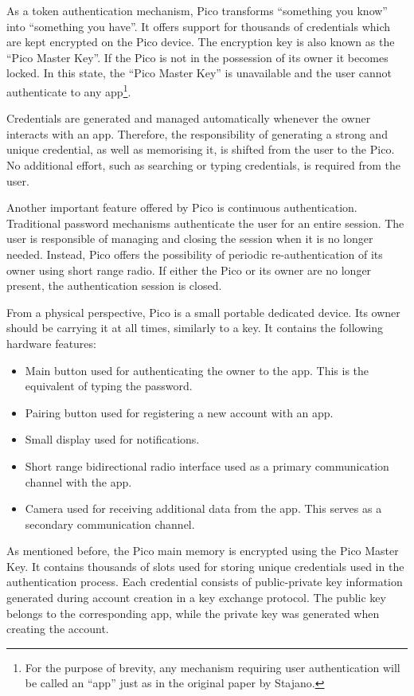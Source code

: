 As a token authentication mechanism, Pico transforms ``something you know'' into ``something you have''. It offers support for thousands of credentials which are kept encrypted on the Pico device. The encryption key is also known as the ``Pico Master Key''. If the Pico is not in the possession of its owner it becomes locked. In this state, the ``Pico Master Key'' is unavailable and the user cannot authenticate to any app\footnote{For the purpose of brevity, any mechanism requiring user authentication will be called an ``app'' just as in the original paper by Stajano.}.

Credentials are generated and managed automatically whenever the owner interacts with an app. Therefore, the responsibility of generating a strong and unique credential, as well as memorising it, is shifted from the user to the Pico. No additional effort, such as searching or typing credentials, is required from the user.

Another important feature offered by Pico is continuous authentication. Traditional password mechanisms authenticate the user for an entire session. The user is responsible of managing and closing the session when it is no longer needed. Instead, Pico offers the possibility of periodic re-authentication of its owner using short range radio. If either the Pico or its owner are no longer present, the authentication session is closed. 

From a physical perspective, Pico is a small portable dedicated device. Its owner should be carrying it at all times, similarly to a key. It contains the following hardware features:
\begin{itemize}
	\item Main button used for authenticating the owner to the app. This is the equivalent of typing the password.
	\item Pairing button used for registering a new account with an app.
	\item Small display used for notifications.
	\item Short range bidirectional radio interface used as a primary communication channel with the app.
	\item Camera used for receiving additional data from the app. This serves as a secondary communication channel.
\end{itemize}

As mentioned before, the Pico main memory is encrypted using the Pico Master Key. It contains thousands of slots used for storing unique credentials used in the authentication process. Each credential consists of public-private key information generated during account creation in a key exchange protocol. The public key belongs to the corresponding app, while the private key was generated when creating the account. 

